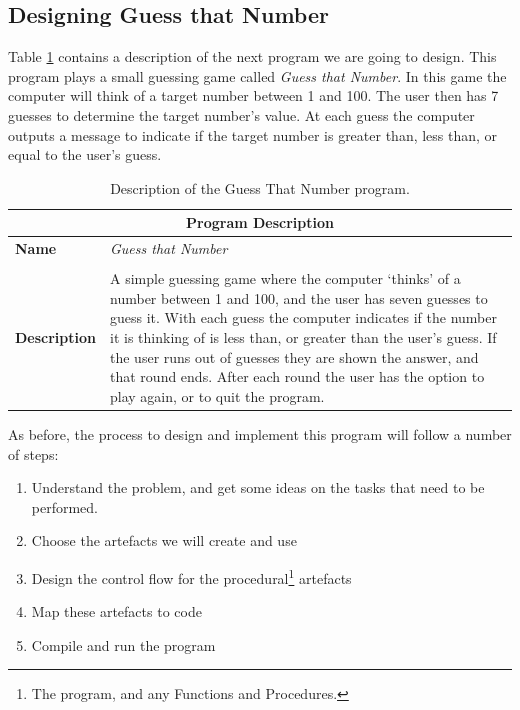 \subsection{Designing Guess that Number} %
\label{sub:designing_guess_that_number}

Table \ref{tbl:control-flow-prog} contains a description of the next program we are going to design. This program plays a small guessing game called \emph{Guess that Number}. In this game the computer will think of a target number between 1 and 100. The user then has 7 guesses to determine the target number's value. At each guess the computer outputs a message to indicate if the target number is greater than, less than, or equal to the user's guess.

\begin{table}[h]
\centering
\begin{tabular}{l|p{10cm}}
  \hline
  \multicolumn{2}{c}{\textbf{Program Description}} \\
  \hline
  \textbf{Name} & \emph{Guess that Number} \\
  \\
  \textbf{Description} & A simple guessing game where the computer `thinks' of a number between 1 and 100, and the user has seven guesses to guess it. With each guess the computer indicates if the number it is thinking of is less than, or greater than the user's guess. If the user runs out of guesses they are shown the answer, and that round ends. After each round the user has the option to play again, or to quit the program.\\
  \hline
\end{tabular}
\caption{Description of the Guess That Number program.}
\label{tbl:control-flow-prog}
\end{table}

As before, the process to design and implement this program will follow a number of steps:
\begin{enumerate}
  \item Understand the problem, and get some ideas on the tasks that need to be performed.
  \item Choose the artefacts we will create and use
  \item Design the control flow for the procedural\footnote{The program, and any Functions and Procedures.} artefacts
  \item Map these artefacts to code
  \item Compile and run the program
\end{enumerate}


